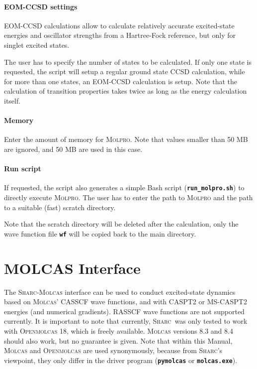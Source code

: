\documentclass[a4paper,10pt,DIV=15,openany]{scrbook}
\newcommand{\sharc}{\textsc{Sharc}}
\newcommand{\ttt}[1]{\textbf{\texttt{#1}}}
\begin{document}
\paragraph{EOM-CCSD settings}

EOM-CCSD calculations allow to calculate relatively accurate excited-state energies and oscillator strengths from a Hartree-Fock reference, but only for singlet excited states.

The user has to specify the number of states to be calculated. If only one state is requested, the script will setup a regular ground state CCSD calculation, while for more than one states, an EOM-CCSD calculation is setup.
Note that the calculation of transition properties takes twice as long as the energy calculation itself.

\paragraph{Memory}

Enter the amount of memory for \textsc{Molpro}. Note that values smaller than 50 MB are ignored, and 50 MB are used in this case.

\paragraph{Run script}

If requested, the script also generates a simple Bash script (\ttt{run\_molpro.sh}) to directly execute \textsc{Molpro}. The user has to enter the path to \textsc{Molpro} and the path to a suitable (fast) scratch directory. 

Note that the scratch directory will be deleted after the calculation, only the wave function file \ttt{wf} will be copied back to the main directory.








\section{MOLCAS Interface}\label{sec:int:molcas}

The \sharc-\textsc{Molcas} interface can be used to conduct excited-state dynamics based on \textsc{Molcas}' CASSCF wave functions, and with CASPT2 or MS-CASPT2 energies (and numerical gradients). 
RASSCF wave functions are not supported currently. 
It is important to note that currently, \sharc\ was only tested to work with \textsc{Openmolcas} 18, which is freely available.
\textsc{Molcas} versions 8.3 and 8.4 should also work, but no guarantee is given.
Note that within this Manual, \textsc{Molcas} and \textsc{Openmolcas} are used synonymously, because from \sharc's viewpoint, they only differ in the driver program (\ttt{pymolcas} or \ttt{molcas.exe}).
\end{document}
